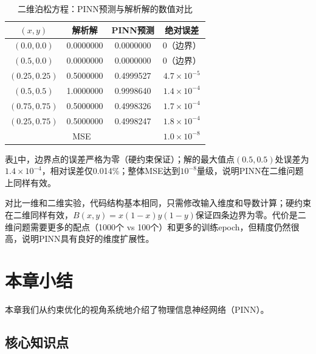 \begin{table}[htbp]
\centering
\caption{二维泊松方程：PINN预测与解析解的数值对比}
\label{tab:pinn_2d_comparison}
\begin{tabular}{c|ccc}
\hline
$(x, y)$ & 解析解 & PINN预测 & 绝对误差 \\
\hline
$(0.0, 0.0)$ & 0.0000000 & 0.0000000 & 0（边界） \\
$(0.5, 0.0)$ & 0.0000000 & 0.0000000 & 0（边界） \\
$(0.25, 0.25)$ & 0.5000000 & 0.4999527 & $4.7 \times 10^{-5}$ \\
$(0.5, 0.5)$ & 1.0000000 & 0.9998640 & $1.4 \times 10^{-4}$ \\
$(0.75, 0.75)$ & 0.5000000 & 0.4998326 & $1.7 \times 10^{-4}$ \\
$(0.25, 0.75)$ & 0.5000000 & 0.4998247 & $1.8 \times 10^{-4}$ \\
\hline
\multicolumn{3}{c|}{MSE} & $1.0 \times 10^{-8}$ \\
\hline
\end{tabular}
\end{table}

表\ref{tab:pinn_2d_comparison}中，边界点的误差严格为零（硬约束保证）；解的最大值点$(0.5, 0.5)$处误差为$1.4 \times 10^{-4}$，相对误差仅0.014\%；整体MSE达到$10^{-8}$量级，说明PINN在二维问题上同样有效。

\begin{tcolorbox}[colback=green!5, colframe=green!50, title=从一维到二维的扩展]
对比一维和二维实验，代码结构基本相同，只需修改输入维度和导数计算；硬约束在二维同样有效，$B(x,y) = x(1-x)y(1-y)$保证四条边界为零。代价是二维问题需要更多的配点（1000个 vs 100个）和更多的训练epoch，但精度仍然很高，说明PINN具有良好的维度扩展性。
\end{tcolorbox}

\section{本章小结}

本章我们从约束优化的视角系统地介绍了物理信息神经网络（PINN）。

\subsection{核心知识点}

